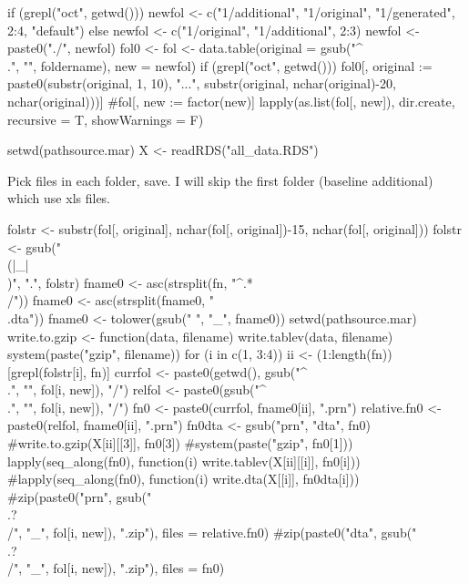 \begin{Schunk}
\begin{Sinput}
if (grepl("oct", getwd())) newfol <- c("1/additional", "1/original", "1/generated", 2:4, "default") else
	newfol <- c("1/original", "1/additional", 2:3)
newfol <- paste0("./", newfol)
fol0 <- fol <- data.table(original = gsub("^\\.", "", foldername), new = newfol)
if (grepl("oct", getwd())) 
fol0[, original := paste0(substr(original, 1, 10), "...", 
	substr(original, nchar(original)-20, nchar(original)))]
#fol[, new := factor(new)]
lapply(as.list(fol[, new]), dir.create, recursive = T, showWarnings = F)
\end{Sinput}
\end{Schunk}
\begin{Schunk}
\begin{Sinput}
setwd(pathsource.mar)
X <- readRDS("all_data.RDS")
\end{Sinput}
\end{Schunk}
Pick files in each folder, save. I will skip the first folder (baseline additional) which use \textsf{xls} files.
\begin{Schunk}
\begin{Sinput}
folstr <- substr(fol[, original], nchar(fol[, original])-15, nchar(fol[, original]))
folstr <- gsub("\\(|_|\\)", ".", folstr)
fname0 <- asc(strsplit(fn, "^.*\\/"))
fname0 <- asc(strsplit(fname0, "\\.dta"))
fname0 <- tolower(gsub(" ", "_", fname0))
setwd(pathsource.mar)
write.to.gzip <- function(data, filename) {
	write.tablev(data, filename)
	system(paste("gzip", filename))
}
for (i in c(1, 3:4)) {
	ii <- (1:length(fn))[grepl(folstr[i], fn)]
	currfol <- paste0(getwd(), gsub("^\\.", "", fol[i, new]), "/")
	relfol <- paste0(gsub("^\\.", "", fol[i, new]), "/")
	fn0 <- paste0(currfol, fname0[ii], ".prn")
	relative.fn0 <- paste0(relfol, fname0[ii], ".prn")
	fn0dta <- gsub("prn", "dta", fn0)
	#write.to.gzip(X[ii][[3]], fn0[3])
	#system(paste("gzip", fn0[1]))
	lapply(seq_along(fn0), function(i) write.tablev(X[ii][[i]], fn0[i]))
	#lapply(seq_along(fn0), function(i) write.dta(X[[i]], fn0dta[i]))
	#zip(paste0("prn", gsub("\\.?\\/", "_", fol[i, new]), ".zip"), files = relative.fn0)
	#zip(paste0("dta", gsub("\\.?\\/", "_", fol[i, new]), ".zip"), files = fn0)
}
\end{Sinput}
\end{Schunk}

